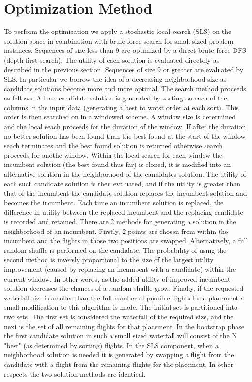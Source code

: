 \documentclass[12pt]{article}
\begin{document}
    \section*{Optimization Method}
    To perform the optimization we apply a stochastic local search (SLS) on the solution space in combination with brufe force search for small sized problem instances.
    Sequences of size less than 9 are optimized by a direct brute force DFS (depth first search). The utility of each solution is evaluated directoly as described in the previous section.
    Sequences of size 9 or greater are evaluated by SLS. In particular we borrow the idea of a decreasing neighborhood size as candidate solutions become more and more optimal. 
    The search method proceeds as follows: A base candidate solution is generated by sorting on each of the columns in the input data (generating a best to worst order at each sort). 
    This order is then searched on in a windowed scheme. A window size is determined and the local seach proceeds for the duration of the window. If after the duration no better solution has 
    been found than the best found at the start of the window seach terminates and the best found solution is returned otherwise search proceeds for anothe window. Within the local search for 
    each window the incumbent solution (the best found thus far) is cloned, it is modified into an alternative solution in the neighborhood of the candidates solution. The utility of each 
    such candidate solution is then evaluated, and if the utility is greater than that of the incumbent the candidate solution replaces the incumbent solution and becomes the incumbent. Each time 
    an incumbent solution is replaced, the difference in utility between the replaced incumbent and the replacing candidate is recorded and retained. There are 2 methods for generating a solution 
    in the neighborhood of an incumbent. Firstly, 2 points are chosen from within the incumbent and the flights in those two positions are swapped. Alternatively, a full random shuffle is performed on
    the candidate. The probability of using the second method is inversly proportional to the size of the largest utility improvement (caused by replacing an incumbent with a candidate) within 
    the current window. In other words, as the added utility of improved incumbent solution decreases the chances of a random shuffle grow. Finally, if the requested waterfall size is smaller than 
    the full number of possible flights for a placement a small modification to this algorithm is made. The initial set is partitioned into two sets. The first set is considered the waterfall of 
    the required size, and the next is the set of all remaining flights for that placement. In the bootstrap phase the first candidate solution in such a small sized waterfall will consist of the 
    N "best" (as determined by sorting) flights. In the SLS component, when a neighborhood solution is needed it is generated by swapping a flight from the candidate with a flight from the remaining
    flights for the placement. In other respects the two solution methods are identical.
\end{document}
